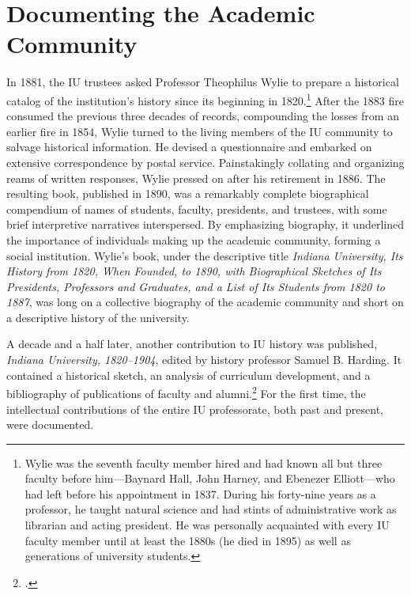 \documentclass[
  american,
  letterpaper,
]{scrreprt}
\begin{document}
\section{Documenting the Academic
Community}\label{documenting-the-academic-community}

In 1881, the IU trustees asked Professor Theophilus Wylie to prepare a
historical catalog of the institution's history since its beginning in
1820.\footnote{Wylie was the seventh faculty member hired and had known
  all but three faculty before him---Baynard Hall, John Harney, and
  Ebenezer Elliott---who had left before his appointment in 1837. During
  his forty-nine years as a professor, he taught natural science and had
  stints of administrative work as librarian and acting president. He
  was personally acquainted with every IU faculty member until at least
  the 1880s (he died in 1895) as well as generations of university
  students.} After the 1883 fire consumed the previous three decades of
records, compounding the losses from an earlier fire in 1854, Wylie
turned to the living members of the IU community to salvage historical
information. He devised a questionnaire and embarked on extensive
correspondence by postal service. Painstakingly collating and organizing
reams of written responses, Wylie pressed on after his retirement in
1886. The resulting book, published in 1890, was a remarkably complete
biographical compendium of names of students, faculty, presidents, and
trustees, with some brief interpretive narratives interspersed. By
emphasizing biography, it underlined the importance of individuals
making up the academic community, forming a social institution. Wylie's
book, under the descriptive title \emph{Indiana University, Its History
from 1820, When Founded, to 1890, with Biographical Sketches of Its
Presidents, Professors and Graduates, and a List of Its Students from
1820 to 1887}, was long on a collective biography of the academic
community and short on a descriptive history of the university.

A decade and a half later, another contribution to IU history was
published, \emph{Indiana University, 1820--1904}, edited by history
professor Samuel B. Harding. It contained a historical sketch, an
analysis of curriculum development, and a bibliography of publications
of faculty and alumni.\footnote{.} For the first time, the
intellectual contributions of the entire IU professorate, both past and
present, were documented.
\end{document}
